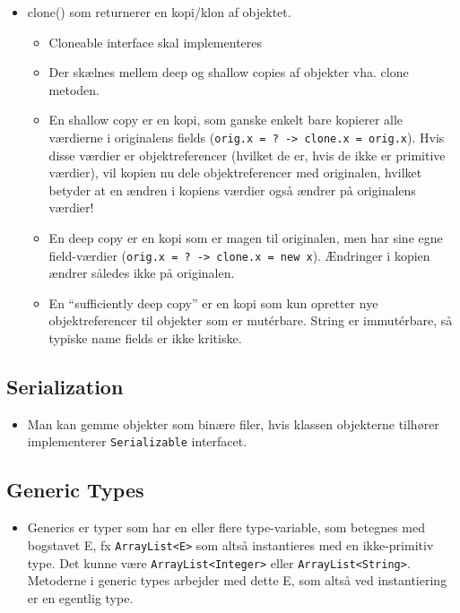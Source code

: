 \begin{itemize}
\begin{itemize}
    \item clone() som returnerer en kopi/klon af objektet.
    \begin{itemize}
      \item Cloneable interface skal implementeres
      \item Der skælnes mellem deep og shallow copies af objekter vha. clone metoden.
      \item En shallow copy er en kopi, som ganske enkelt bare kopierer alle værdierne i originalens fields (\verb|orig.x = ? -> clone.x = orig.x|). Hvis disse værdier er objektreferencer (hvilket de er, hvis de ikke er primitive værdier), vil kopien nu dele objektreferencer med originalen, hvilket betyder at en ændren i kopiens værdier også ændrer på originalens værdier!
      \item En deep copy er en kopi som er magen til originalen, men har sine egne field-værdier (\verb|orig.x = ? -> clone.x = new x|). Ændringer i kopien ændrer således ikke på originalen.
      \item En “sufficiently deep copy” er en kopi som kun opretter nye objektreferencer til objekter som er mutérbare. String er immutérbare, så typiske name fields er ikke kritiske.
    \end{itemize}
  \end{itemize}
\end{itemize}

\subsection{Serialization}

\begin{itemize}
  \item Man kan gemme objekter som binære filer, hvis klassen objekterne tilhører implementerer \verb|Serializable| interfacet.
\end{itemize}

\subsection{Generic Types}

\begin{itemize}
  \item Generics er typer som har en eller flere type-variable, som betegnes med bogstavet E, fx \verb|ArrayList<E>| som altså instantieres med en ikke-primitiv type. Det kunne være \verb|ArrayList<Integer>| eller \verb|ArrayList<String>|. Metoderne i generic types arbejder med dette E, som altså ved instantiering er en egentlig type.
\end{itemize}


